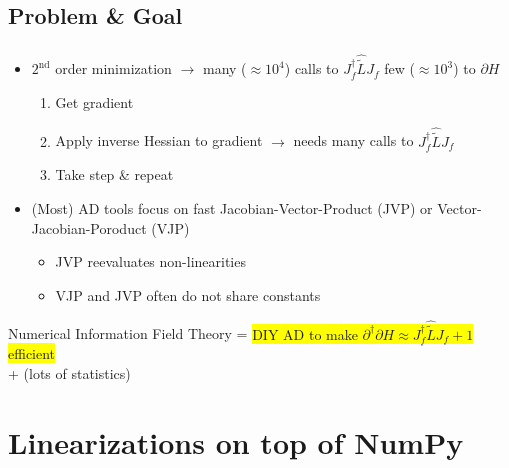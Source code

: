 \documentclass[aspectratio=169,xcolor=dvipsnames]{beamer}
\begin{document}
\subsection{Problem \& Goal}  %
\begin{frame}
	\frametitle{\insertsection}
	\framesubtitle{\insertsubsection}

	\begin{itemize}
		\item $2^\text{nd}$ order minimization $\rightarrow$ many ($\approx10^4$) calls to $J_{f}^\dagger \widehat{\tilde{L}} J_{f}$ few ($\approx10^3$) to $\partial H$
		\begin{enumerate}
			\item Get gradient
			\item Apply inverse Hessian to gradient $\rightarrow$ needs many calls to $J_{f}^\dagger \widehat{\tilde{L}} J_{f}$
			\item Take step \& repeat
		\end{enumerate}
		\pause
		\item (Most) AD tools focus on fast Jacobian-Vector-Product (JVP) or Vector-Jacobian-Poroduct (VJP)
		\begin{itemize}
			\item JVP reevaluates non-linearities
			\item VJP and JVP often do not share constants
		\end{itemize}
	\end{itemize}

	\pause
	\begin{center}
		Numerical Information Field Theory = \colorbox{yellow}{DIY AD to make $\partial^\dagger \partial H  \approx J_{f}^\dagger \widehat{\tilde{L}} J_{f} + 1$ efficient}
		\\ + (lots of statistics)
	\end{center}

\end{frame}

\section{Linearizations on top of NumPy}  %
\end{document}
